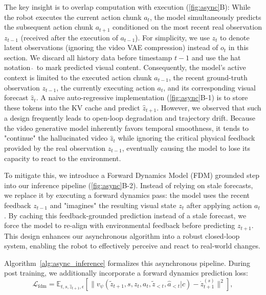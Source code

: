 \documentclass[onecolumn]{robbyant}           %
\begin{document}
The key insight is to overlap computation with execution (\cref{fig:async}B): While the robot executes the current action chunk $a_t$, the model simultaneously predicts the subsequent action chunk $a_{t+1}$ conditioned on the most recent real observation $z_{t-1}$ (received after the execution of $a_{t-1}$).
For simplicity, we use $z_t$ to denote latent observations (ignoring the video VAE compression) instead of $o_t$ in this section.
We discard all history data before timestamp $t-1$ and use the hat notation $\hat{~}$ to mark predicted visual content. Consequently, the model's active context is limited to the executed action chunk $a_{t-1}$, the recent ground-truth observation $z_{t-1}$, the currently executing action $a_t$, and its corresponding visual forecast $\hat{z}_t$. A naive auto-regressive implementation (\cref{fig:async}B-1) is to store these tokens into the KV cache and predict $\hat{z}_{t+1}$. However, we observed that such a design frequently leads to open-loop degradation and trajectory drift. Because the video generative model inherently favors temporal smoothness, it tends to "continue" the hallucinated video $\hat{z}_t$ while ignoring the critical physical feedback provided by the real observation $z_{t-1}$, eventually causing the model to lose its capacity to react to the environment.

To mitigate this, we introduce a Forward Dynamics Model (FDM) grounded step into our inference pipeline (\cref{fig:async}B-2). Instead of relying on stale forecasts, we replace it by executing a forward dynamics pass: the model uses the recent feedback $z_{t-1}$ and "imagines" the resulting visual state $z_{t}$ after applying action $a_t$. By caching this feedback-grounded prediction instead of a stale forecast, we force the model to re-align with environmental feedback before predicting $z_{t+1}$. This design enhances our asynchronous algorithm into a robust closed-loop system, enabling the robot to effectively perceive and react to real-world changes. 

Algorithm~\ref{alg:async_inference} formalizes this asynchronous pipeline. During post training, we additionally incorporate a forward dynamics prediction loss:
\begin{equation}
\mathcal{L}_{\mathrm{fdm}} = \mathbb{E}_{t, s, \hat{z}_{t+1}, \epsilon} \left[ \| v_\psi(\tilde{z}_{t+1}, s , z_t, a_t, \tilde{z}_{<t}, \hat{a}_{<t} | c) - \dot{z}_{t+1}^{(s)} \|^2 \right],
\end{equation}
\end{document}
